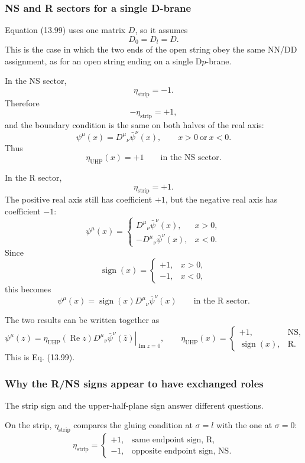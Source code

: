 \documentclass[
  10pt,
  a4paper,
  openany]{book}
\begin{document}
\subsubsection{NS and R sectors for a single
D-brane}\label{ns-and-r-sectors-for-a-single-d-brane}

Equation (13.99) uses one matrix \(D\), so it assumes \[
D_0=D_l=D.
\] This is the case in which the two ends of the open string obey the
same NN/DD assignment, as for an open string ending on a single
D\(p\)-brane.

In the NS sector, \[
\eta_{\mathrm{strip}}=-1.
\] Therefore \[
-\eta_{\mathrm{strip}}=+1,
\] and the boundary condition is the same on both halves of the real
axis: \[
\psi^\mu(x)
={D^\mu}_{\nu}\bar\psi^\nu(x),
\qquad
x>0\ \text{or}\ x<0.
\] Thus \[
\eta_{\mathrm{UHP}}(x)=+1
\qquad
\text{in the NS sector}.
\]

In the R sector, \[
\eta_{\mathrm{strip}}=+1.
\] The positive real axis still has coefficient \(+1\), but the negative
real axis has coefficient \(-1\): \[
\psi^\mu(x)
=
\begin{cases}
{D^\mu}_{\nu}\bar\psi^\nu(x),&x>0,\\[1mm]
-{D^\mu}_{\nu}\bar\psi^\nu(x),&x<0.
\end{cases}
\] Since \[
\operatorname{sign}(x)
=
\begin{cases}
+1,&x>0,\\
-1,&x<0,
\end{cases}
\] this becomes \[
\psi^\mu(x)
=
\operatorname{sign}(x)
{D^\mu}_{\nu}\bar\psi^\nu(x)
\qquad
\text{in the R sector}.
\]

The two results can be written together as \[
\boxed{
\left.
\psi^\mu(z)
=
\eta_{\mathrm{UHP}}(\operatorname{Re}z)
{D^\mu}_{\nu}\bar\psi^\nu(\bar z)
\right|_{\operatorname{Im}z=0},
\qquad
\eta_{\mathrm{UHP}}(x)
=
\begin{cases}
+1,&\mathrm{NS},\\
\operatorname{sign}(x),&\mathrm R.
\end{cases}
}
\] This is Eq. (13.99).

\subsubsection{Why the R/NS signs appear to have exchanged
roles}\label{why-the-rns-signs-appear-to-have-exchanged-roles}

The strip sign and the upper-half-plane sign answer different questions.

On the strip, \(\eta_{\mathrm{strip}}\) compares the gluing condition at
\(\sigma=l\) with the one at \(\sigma=0\): \[
\eta_{\mathrm{strip}}
=
\begin{cases}
+1,&\text{same endpoint sign, R},\\
-1,&\text{opposite endpoint sign, NS}.
\end{cases}
\]
\end{document}
